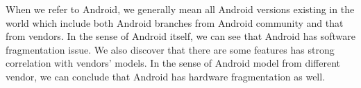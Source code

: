 \documentclass[10pt, conference, compsocconf]{IEEEtran}
\begin{document}
When we refer to Android, we generally mean all Android versions existing in the world which include both Android branches from Android community and that from vendors. In the sense of Android itself, we can see that Android has software fragmentation issue. We also discover that there are some features has strong correlation with vendors' models. In the sense of Android model from different vendor, we can conclude that Android has hardware fragmentation as well.


%
%
%


\end{document}

